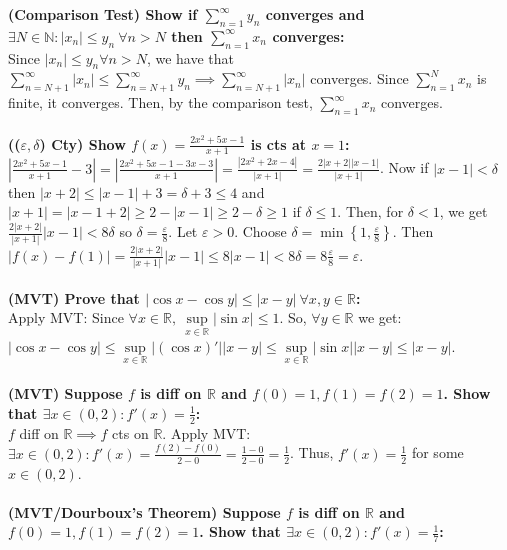 \documentclass{letter}
\begin{document}
\textbf{(Comparison Test) Show if $\sum\limits_{n = 1}^{\infty} y_n$
  converges and $\exists N \in \mathbb{N} : |x_n| \leq y_n \ \forall n
  > N$ then $\sum\limits_{n = 1}^{\infty} x_n$ converges:} \\
Since $|x_n| \leq y_n \forall n > N$, we have that $\sum\limits_{n = N
  + 1}^{\infty} |x_n| \leq \sum\limits_{n = N + 1}^{\infty} y_n
\implies \sum\limits_{n = N + 1}^{\infty}|x_n|$ converges. Since
$\sum\limits_{n = 1}^{N} x_n$ is finite, it converges. Then, by the
comparison test, $\sum\limits_{n = 1}^{\infty} x_n$ converges. \\ \\
\textbf{(($\varepsilon, \delta$) Cty) Show $f(x) = \frac{2x^2 + 5x -
    1}{x + 1}$ is cts at $x = 1$:} \\
$\left| \frac{2x^2 + 5x - 1}{x + 1} - 3 \right| = \left| \frac{2x^2 + 5x - 1
  - 3x - 3}{x + 1} \right|= \frac{|2x^2 + 2x - 4|}{|x + 1|} =
\frac{2|x + 2||x - 1|}{|x + 1|}$. Now if $|x - 1| < \delta$ then $|x +
2| \leq |x - 1| + 3 = \delta + 3 \leq 4$ and $|x + 1| = |x - 1 + 2|
\geq 2 - |x - 1| \geq 2 - \delta \geq 1$ if $\delta \leq 1$. Then, for
$\delta < 1$, we get $\frac{2|x + 2|}{|x + 1|}|x - 1| < 8\delta$ so
$\delta = \frac{\varepsilon}{8}$. Let $\varepsilon > 0$. Choose
$\delta = \min\left\{ 1, \frac{\varepsilon}{8} \right\}$. Then $|f(x) -
  f(1)| = \frac{2|x + 2|}{|x + 1|}|x - 1| \leq 8|x - 1| < 8\delta = 8
  \frac{\varepsilon}{8} = \varepsilon$. \\ \\
\textbf{(MVT) Prove that $|\cos x - \cos y| \leq |x - y| \ \forall x,
  y \in \mathbb{R}$:} \\
Apply MVT: Since $\forall x \in \mathbb{R}, \ \sup\limits_{x \in
  \mathbb{R}} |\sin x| \leq 1$. So, $\forall y \in \mathbb{R}$ we get:
$|\cos x - \cos y| \leq \sup\limits_{x \in \mathbb{R}} |(\cos x)'||x -
y| \leq \sup\limits_{x \in \mathbb{R}} |\sin x||x - y| \leq |x - y|$. \\ \\
\textbf{(MVT) Suppose $f$ is diff on $\mathbb{R}$ and $f(0) = 1, f(1)
  = f(2) = 1$. Show that $\exists x \in (0, 2) : f'(x) =
  \frac{1}{2}$:} \\
$f$ diff on $\mathbb{R} \implies f$ cts on $\mathbb{R}$. Apply MVT:
$\exists x \in (0, 2) : f'(x) = \frac{f(2) - f(0)}{2 - 0} = \frac{1 -
  0}{2 - 0} = \frac{1}{2}$. Thus, $f'(x) = \frac{1}{2}$ for some $x
\in (0, 2)$. \\ \\
\textbf{(MVT/Dourboux's Theorem) Suppose $f$ is diff on $\mathbb{R}$
  and $f(0) = 1, f(1) = f(2) = 1$. Show that $\exists x \in (0, 2) :
  f'(x) = \frac{1}{7}$:} \\
\end{document}

